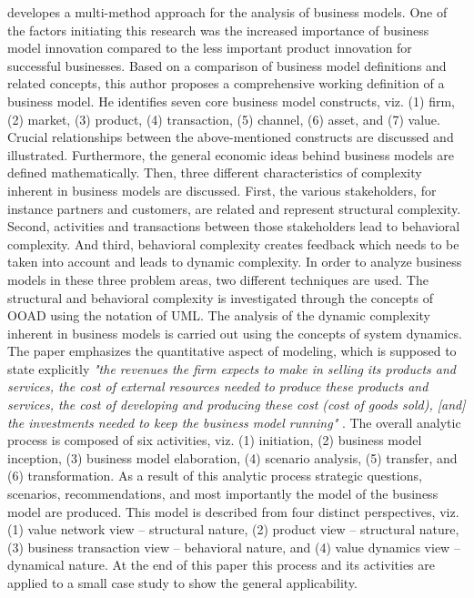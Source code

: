 \citet{Grasl2008} developes a multi-method approach for the analysis of business models. One of the factors initiating this research was the increased importance of business model innovation compared to the less important product innovation for successful businesses. Based on a comparison of business model definitions and related concepts, this author proposes a comprehensive working definition of a business model. He identifies seven core business model constructs, viz. (1) firm, (2) market, (3) product, (4) transaction, (5) channel, (6) asset, and (7) value. Crucial relationships between the above-mentioned constructs are discussed and illustrated. Furthermore, the general economic ideas behind business models are defined mathematically. Then, three different characteristics of complexity inherent in business models are discussed. First, the various stakeholders, for instance partners and customers, are related and represent structural complexity. Second, activities and transactions between those stakeholders lead to behavioral complexity. And third, behavioral complexity creates feedback which needs to be taken into account and leads to dynamic complexity. In order to analyze business models in these three problem areas, two different techniques are used. The structural and behavioral complexity is investigated through the concepts of \ac{OOAD} using the notation of \ac{UML}. The analysis of the dynamic complexity inherent in business models is carried out using the concepts of system dynamics. The paper emphasizes the quantitative aspect of modeling, which is supposed to state explicitly \textit{"the revenues the firm expects to make in selling its products and services, the cost of external resources needed to produce these products and services, the cost of developing and producing these cost (cost of goods sold), [and] the investments needed to keep the business model running"} \citep[p. 10]{Grasl2008}. The overall analytic process is composed of six activities, viz. (1) initiation, (2) business model inception, (3) business model elaboration, (4) scenario analysis, (5) transfer, and (6) transformation. As a result of this analytic process strategic questions, scenarios, recommendations, and most importantly the model of the business model are produced. This model is described from four distinct perspectives, viz. (1) value network view -- structural nature, (2) product view -- structural nature, (3) business transaction view -- behavioral nature, and (4) value dynamics view -- dynamical nature. At the end of this paper this process and its activities are applied to a small case study to show the general applicability.

